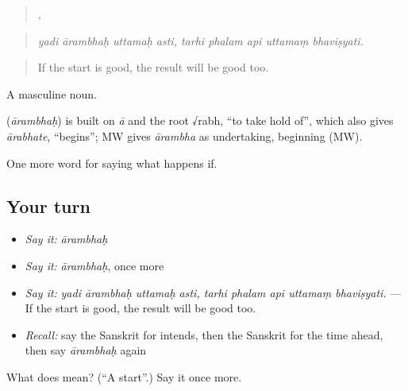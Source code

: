 \begin{quote}
   ,     
\end{quote}

\begin{quote}
\emph{yadi ārambhaḥ uttamaḥ asti, tarhi phalam api uttamaṃ bhaviṣyati.}
\end{quote}

\begin{quote}
If the start is good, the result will be good too.
\end{quote}

A masculine noun.

\begin{cousinweb}
\textbf{} (\emph{ārambhaḥ}) is built on \emph{ā} and the root √rabh, \textquotedblleft{}to take hold of\textquotedblright{}, which also gives \emph{ārabhate}, \textquotedblleft{}begins\textquotedblright{}; MW gives \emph{ārambha} as undertaking, beginning (MW).
\end{cousinweb}

\begin{grammarlens}[title={What you've built}]
One more word for saying what happens if.
\end{grammarlens}

\subsection*{Your turn}
\begin{itemize}
\raggedright
  \item \emph{Say it:} \emph{ārambhaḥ}
  \item \emph{Say it:} \emph{ārambhaḥ}, once more
  \item \emph{Say it:} \emph{yadi ārambhaḥ uttamaḥ asti, tarhi phalam api uttamaṃ bhaviṣyati.} — If the start is good, the result will be good too.
  \item \emph{Recall:} say the Sanskrit for intends, then the Sanskrit for the time ahead, then say \emph{ārambhaḥ} again
\end{itemize}

\begin{tcolorbox}[breakable,colback=teal!4,colframe=teal!35!black,title={Before you move on}]
What does  mean? (\textquotedblleft{}A start\textquotedblright{}.) Say it once more.
\end{tcolorbox}
